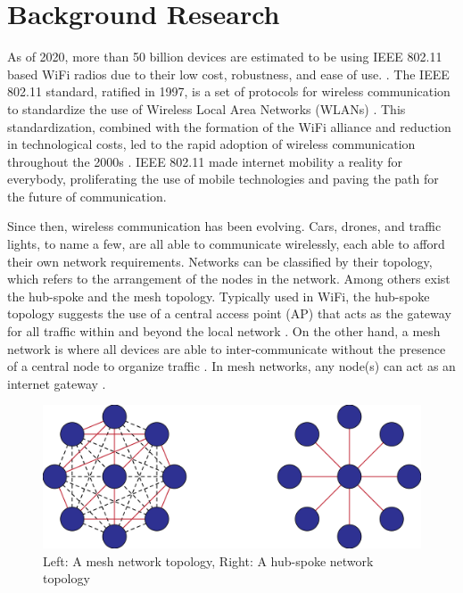 \section{Background Research}
\label{section:background_research}

As of 2020, more than 50 billion devices are estimated to be using IEEE 802.11 based WiFi radios due to their low cost, robustness, and ease of use. \cite{G_Davis_2018}. The IEEE 802.11 standard, ratified in 1997, is a set of protocols for wireless communication to standardize the use of Wireless Local Area Networks (WLANs) \cite{perahia2013next}. This standardization, combined with the formation of the WiFi alliance and reduction in technological costs, led to the rapid adoption of wireless communication throughout the 2000s \cite{perahia2013next}. IEEE 802.11 made internet mobility a reality for everybody, proliferating the use of mobile technologies and paving the path for the future of communication. 


Since then, wireless communication has been evolving. Cars, drones, and traffic lights, to name a few, are all able to communicate wirelessly, each able to afford their own network requirements. Networks can be classified by their topology, which refers to the arrangement of the nodes in the network. Among others exist the hub-spoke and the mesh topology. Typically used in WiFi, the hub-spoke topology suggests the use of a central access point (AP) that acts as the gateway for all traffic within and beyond the local network \cite{ti_lethaby2017wireless}. On the other hand, a mesh network is where all devices are able to inter-communicate without the presence of a central node to organize traffic \cite{ti_lethaby2017wireless}. In mesh networks, any node(s) can act as an internet gateway \cite{ti_lethaby2017wireless}. 

\begin{figure}[H]
    \centering
    \includegraphics[width=0.6\columnwidth]{images/mesh_vs_hub_spoke.png}
    \caption{Left: A mesh network topology, Right: A hub-spoke network topology}
    \label{fig:hub_spoke_mesh_diff}
\end{figure}

